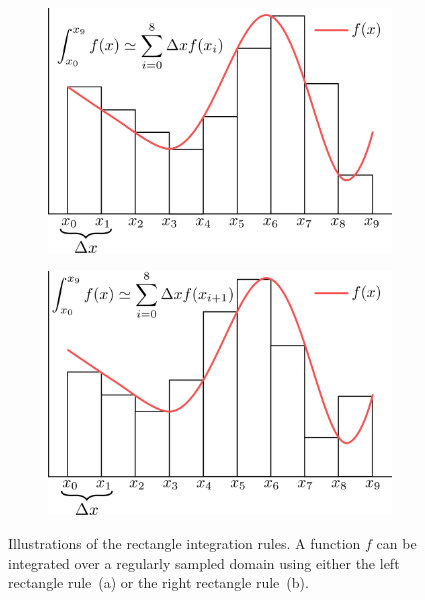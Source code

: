 \begin{figure}[!ht]
	\centering
	\begin{subfigure}[b]{0.46\linewidth}
		\centering
		\includegraphics[width=\linewidth]{images/continuum_mechanics/rectangleRule_left.png}
		\caption{\label{fig:leftRectangleRule}}
	\end{subfigure}
	\hspace{0.2cm}
	\begin{subfigure}[b]{0.46\linewidth}
		\centering
		\includegraphics[width=\linewidth]{images/continuum_mechanics/rectangleRule_right.png}
		\caption{\label{fig:rightRectangleRule}}
	\end{subfigure}
	\caption[STAR mechanics: Rectangle integration rules]{\label{fig:rectangleRules}
		Illustrations of the rectangle integration rules. A function $f$ can be integrated over a regularly sampled domain using either the left rectangle rule~(a) or the right rectangle rule~(b).}
\end{figure}

